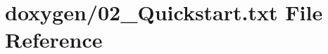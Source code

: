 \hypertarget{02__Quickstart_8txt}{\section{doxygen/02\+\_\+\+Quickstart.txt File Reference}
\label{02__Quickstart_8txt}
}
